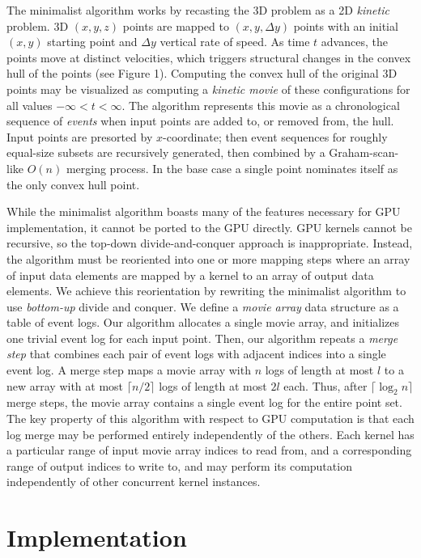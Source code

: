 \documentclass{article}
\begin{document}
The minimalist algorithm works by recasting the 3D problem as a 2D \emph{kinetic} problem. 3D $(x, y, z)$ points are mapped to $(x, y, \Delta y)$ points with an initial $(x, y)$ starting point and $\Delta y$ vertical rate of speed. As time $t$ advances, the points move at distinct velocities, which triggers structural changes in the convex hull of the points (see Figure 1). Computing the convex hull of the original 3D points may be visualized as computing a \emph{kinetic movie} of these configurations for all values $-\infty < t < \infty$. The algorithm represents this movie as a chronological sequence of \emph{events} when input points are added to, or removed from, the hull. Input points are presorted by $x$-coordinate; then event sequences for roughly equal-size subsets are recursively generated, then combined by a Graham-scan-like $O(n)$ merging process. In the base case a single point nominates itself as the only convex hull point.

While the minimalist algorithm boasts many of the features necessary for GPU implementation, it cannot be ported to the GPU directly. GPU kernels cannot be recursive, so the top-down divide-and-conquer approach is inappropriate. Instead, the algorithm must be reoriented into one or more mapping steps where an array of input data elements are mapped by a kernel to an array of output data elements. We achieve this reorientation by rewriting the minimalist algorithm to use \emph{bottom-up} divide and conquer. We define a \emph{movie array} data structure as a table of event logs. Our algorithm allocates a single movie array, and initializes one trivial event log for each input point. Then, our algorithm repeats a \emph{merge step} that combines each pair of event logs with adjacent indices into a single event log. A merge step maps a movie array with $n$ logs of length at most $l$ to a new array with at most $\lceil n/2 \rceil$ logs of length at most $2l$ each. Thus, after $\lceil \log_2 n \rceil$ merge steps, the movie array contains a single event log for the entire point set. The key property of this algorithm with respect to GPU computation is that each log merge may be performed entirely independently of the others. Each kernel has a particular range of input movie array indices to read from, and a corresponding range of output indices to write to, and may perform its computation independently of other concurrent kernel instances.

\section{Implementation}
\end{document}
